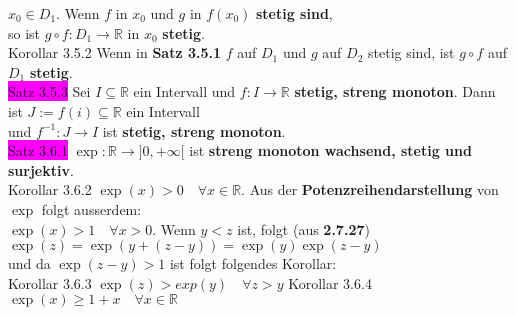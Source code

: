 \documentclass[10pt]{article}
\begin{document}
                \textcolor{NavyBlue}{$x_0\in D_1$}.
                Wenn \textcolor{NavyBlue}{$f$} in \textcolor{NavyBlue}{$x_0$} und 
                \textcolor{NavyBlue}{$g$} in \textcolor{NavyBlue}{$f(x_0)$} 
                \textbf{stetig sind}, \\
        \indent so ist \textcolor{NavyBlue}{
                $g\circ f:D_1\longrightarrow\mathbb{R}$} in \textcolor{NavyBlue}{$x_0$} 
                \textbf{stetig}.\\
\colorbox{BurntOrange}{Korollar 3.5.2} Wenn in \textbf{Satz 3.5.1} 
                \textcolor{NavyBlue}{$f$} auf \textcolor{NavyBlue}{$D_1$} und 
                \textcolor{NavyBlue}{$g$} auf \textcolor{NavyBlue}{$D_2$}
                stetig sind, ist \textcolor{NavyBlue}{$g\circ f$} auf 
                \textcolor{NavyBlue}{$D_1$}
                \textbf{stetig}.\\
\colorbox{magenta}{Satz 3.5.3} Sei \textcolor{NavyBlue}{$I\subseteq\mathbb{R}$} 
                ein Intervall und 
                \textcolor{NavyBlue}{$f:I\longrightarrow\mathbb{R}$} 
                \textbf{stetig, streng monoton}. Dann ist 
                \textcolor{NavyBlue}{$J:=f(i)\subseteq\mathbb{R}$} ein Intervall \\
        \indent und \textcolor{NavyBlue}{$f^{-1}:J\longrightarrow I$} 
                ist \textbf{stetig, streng monoton}.\\
\colorbox{magenta}{Satz 3.6.1} \textcolor{NavyBlue}{
                $\exp:\mathbb{R}\longrightarrow]0,+\infty[$}
                ist \textbf{streng monoton wachsend, stetig und surjektiv}.\\
\colorbox{BurntOrange}{Korollar 3.6.2} 
                \textcolor{NavyBlue}{$\exp(x)>0\quad\forall x\in\mathbb{R}$}. 
                Aus der \textbf{Potenzreihendarstellung} von 
                \textcolor{NavyBlue}{$\exp$} folgt ausserdem: \\
        \indent \textcolor{NavyBlue}{$\exp(x)>1\quad\forall x>0$}. 
                Wenn \textcolor{NavyBlue}{$y<z$} ist, folgt (aus \textbf{2.7.27}) 
                \textcolor{NavyBlue}{$\exp(z)=\exp(y+(z-y))=\exp(y)\exp(z-y)$}  \\
        \indent und da \textcolor{NavyBlue}{$\exp(z-y)>1$} ist folgt folgendes Korollar:\\
\colorbox{BurntOrange}{Korollar 3.6.3} 
                \textcolor{NavyBlue}{$\exp(z)>exp(y)\quad\forall z>y$}\qquad\qquad
\colorbox{BurntOrange}{Korollar 3.6.4} 
                \textcolor{NavyBlue}{$\exp(x)\geqslant1+x\quad\forall x\in\mathbb{R}$}\\
\end{document}
